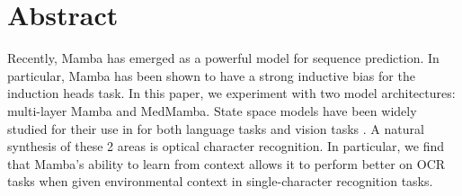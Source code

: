 \section{Abstract}
Recently, Mamba has emerged as a powerful model for sequence prediction.
In particular, Mamba has been shown to have a strong inductive bias for the
induction heads task. In this paper, we experiment with two model architectures:
multi-layer Mamba and MedMamba. 
State space models have been widely studied for their use in for both language
tasks\cite{mamba} and vision tasks\cite{medmamba} \cite{vmamba} \cite{s4}.
A natural synthesis of these 2 areas is optical character recognition.
In particular, we find that Mamba's ability to learn from context allows it to
perform better on OCR tasks when given environmental context in single-character
recognition tasks.
